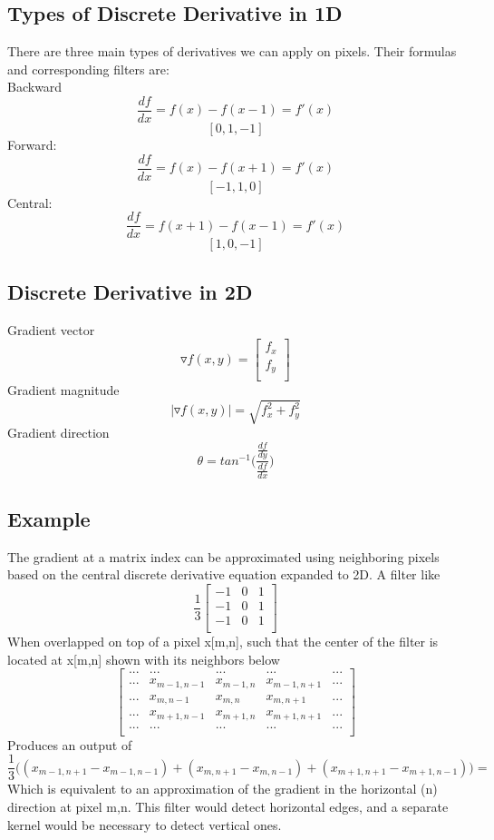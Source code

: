 \documentclass{article}
\begin{document}
\subsection{Types of Discrete Derivative in 1D}
There are three main types of derivatives we can apply on pixels. Their formulas and corresponding filters are:\\
Backward
$$\frac{df}{dx} = f(x) - f(x-1) = f'(x)$$
$$[0, 1, -1]$$
Forward:
$$\frac{df}{dx} = f(x) - f(x+1) = f'(x)$$
$$[-1, 1, 0]$$
Central:
$$\frac{df}{dx} = f(x+1) - f(x-1) = f'(x)$$
$$[1, 0, -1]$$
\subsection{Discrete Derivative in 2D}
Gradient vector
$$ \triangledown f(x,y) = \begin{bmatrix} f_x\\ 
f_y\\
\end{bmatrix}  $$
Gradient magnitude
$$ |\triangledown f(x,y)| = \sqrt{f_x^2 + f_y^2}$$
Gradient direction
$$ \theta = tan^{-1}\Big( \frac{\frac{df}{dy}}{\frac{df}{dx}}\Big)$$

\subsection{Example}
The gradient at a matrix index can be approximated using neighboring pixels based on the central discrete derivative equation expanded to 2D. A filter like
$$ \frac{1}{3}\begin{bmatrix} -1 & 0 & 1\\
-1 & 0 & 1 \\
-1 & 0 & 1 \\\end{bmatrix}$$
When overlapped on top of a pixel x[m,n], such that the center of the filter is located at x[m,n] shown with its neighbors below 
$$ \begin{bmatrix}
...&...&...&...&...\\
...&x_{m-1,n-1} & x_{m-1,n} & x_{m-1,n+1}&... \\
...&x_{m,n-1} & x_{m,n} & x_{m,n+1}&...\\
...&x_{m+1,n-1} & x_{m+1,n} & x_{m+1,n+1}&...\\
...&...&...&...&...\\
\end{bmatrix}
$$
Produces an output of 
$$\frac{1}{3}\Big((x_{m-1,n+1} - x_{m-1,n-1})+ (x_{m,n+1}-x_{m,n-1}) + (x_{m+1,n+1} - x_{m+1,n-1})\Big) = $$
Which is equivalent to an approximation of the gradient in the horizontal (n) direction at pixel m,n. This filter would detect horizontal edges, and a separate kernel would be necessary to detect vertical ones.   
\end{document}

